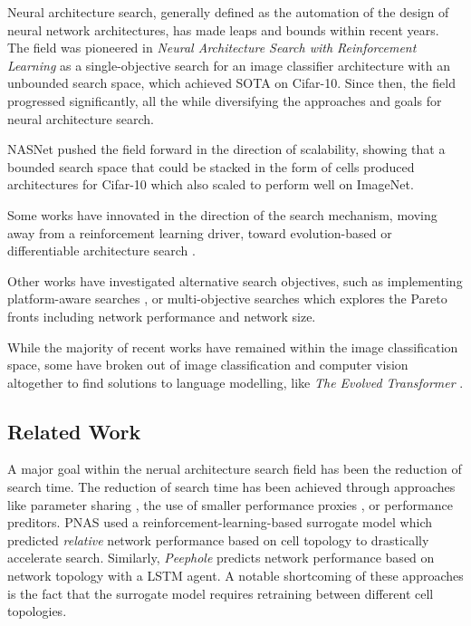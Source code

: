 \documentclass[twocolumn]{article}
\begin{document}
Neural architecture search, generally defined as the automation of the design of neural network architectures, has made leaps and bounds within recent years.
The field was pioneered in \emph{Neural Architecture Search with Reinforcement Learning} \cite{rl_nas} as a single-objective search for an image classifier architecture 
with an unbounded search space, which achieved SOTA on Cifar-10.
Since then, the field progressed significantly, all the while diversifying the approaches and goals for neural architecture search.

NASNet \cite{nasnet} pushed the field forward in the direction of scalability, showing that a bounded search space that could be stacked in the form
of cells produced architectures for Cifar-10 which also scaled to perform well on ImageNet.

Some works have innovated in the direction of the search mechanism, moving away from a reinforcement learning driver, toward evolution-based \cite{amoebanet}
or differentiable architecture search \cite{darts}.

Other works have investigated alternative search objectives, such as implementing platform-aware searches \cite{mnas} \cite{hardware_darts}, 
or multi-objective searches \cite{lemonade} which explores the Pareto fronts including network performance and network size.

While the majority of recent works have remained within the image classification space, some have broken out of image classification and computer vision
altogether to find solutions to language modelling, like \emph{The Evolved Transformer} \cite{evolved_transformer}.


\subsection{Related Work}

A major goal within the nerual architecture search field has been the reduction of search time.
The reduction of search time has been achieved through approaches like parameter sharing \cite{enas} \cite{cars},
the use of smaller performance proxies \cite{econas}, or performance preditors.
PNAS used a reinforcement-learning-based surrogate model which predicted \emph{relative} network performance based on cell topology to drastically
accelerate search. 
Similarly, \emph{Peephole} \cite{peephole} predicts network performance based on network topology with a LSTM agent.
A notable shortcoming of these approaches is the fact that the surrogate model requires retraining between different cell topologies.
\end{document}
